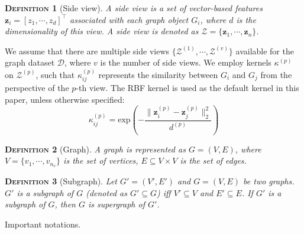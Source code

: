 \documentclass[conference]{IEEEtran}
\newtheorem{Definition}{\textsc{Definition}}
\begin{document}
\begin{Definition}[Side view]
A side view is a set of vector-based features $\mathbf{z}_i=[z_1,\cdots,z_d]^\top$ associated with each graph object $G_i$, where $d$ is the dimensionality of this view. A side view is denoted as $\mathcal{Z}=\{\mathbf{z}_1,\cdots,\mathbf{z}_n\}$.
\end{Definition}

We assume that there are multiple side views $\{\mathcal{Z}^{(1)},\cdots,\mathcal{Z}^{(v)}\}$ available for the graph dataset $\mathcal{D}$, where $v$ is the number of side views. We employ kernels $\kappa^{(p)}$ on $\mathcal{Z}^{(p)}$, such that $\kappa^{(p)}_{ij}$ represents the similarity between $G_i$ and $G_j$ from the perspective of the $p$-th view.
The RBF kernel is used as the default kernel in this paper, unless otherwise specified:
\begin{equation}
\kappa^{(p)}_{ij}=\text{exp}\left(-\frac{\|\mathbf{z}_i^{(p)}-\mathbf{z}_j^{(p)}\|_2^2}{d^{(p)}}\right)
\label{eq:rbf}
\end{equation}\begin{Definition}[Graph] A graph is represented as $G =(V,E)$, where $V=\{v_1,\cdots,v_{n_v}\}$ is the set of vertices, $E\subseteq V\times V$ is the set of edges.
\end{Definition}\begin{Definition}[Subgraph]
Let $G'=(V',E')$ and $G=(V,E)$ be two graphs. $G'$ is a subgraph of $G$ (denoted as $G'\subseteq G$) iff $V'\subseteq V$ and $E'\subseteq E$. If $G'$ is a subgraph of $G$, then $G$ is supergraph of $G'$.
\end{Definition}%
\centering
\caption{Important notations.}\label{tab_notation}
\end{document}
